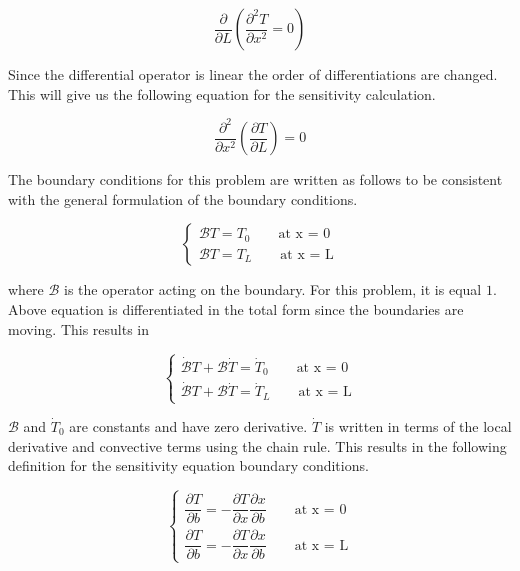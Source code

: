 \begin{equation*}
	\frac{\partial}{\partial L}
	\left( \frac{\partial^2 T}{\partial x^2} = 0 \right)
\end{equation*}

Since the differential operator is linear the order of differentiations are changed. This will give us the following equation for the sensitivity calculation.

\begin{equation}\label{eq:C2_laplaceSAequation}
	\frac{\partial^2}{\partial x^2} \left( \frac{\partial T}{\partial L} \right) = 0
\end{equation}

The boundary conditions for this problem are written as follows to be consistent with the general formulation of the boundary conditions. 

\begin{equation*}
\begin{cases}
	\mathcal{B}T = T_0 \qquad \text{at x = 0} \\
	\mathcal{B}T = T_L \qquad \text{at x = L}
\end{cases}
\end{equation*}

where $\mathcal{B}$ is the operator acting on the boundary. For this problem, it is equal $1$. Above equation is differentiated in the total form since the boundaries are moving. This results in

\begin{equation*}
\begin{cases}
	\dot{\mathcal{B}} T + \mathcal{B} \dot{T} = \dot{T}_0 \qquad \text{at x = 0} \\
	\dot{\mathcal{B}} T + \mathcal{B} \dot{T} = \dot{T}_L \qquad \text{at x = L}
\end{cases}
\end{equation*}

$\mathcal{B}$ and $\dot{T}_0$ are constants and have zero derivative. $\dot{T}$ is written in terms of the local derivative and convective terms using the chain rule. This results in the following definition for the sensitivity equation boundary conditions.

\begin{equation*}
\begin{cases}
	\dfrac{\partial T}{\partial b} = -\dfrac{\partial T}{\partial x} \dfrac{\partial x}{\partial b} \qquad \text{at x = 0}
	\\
	\dfrac{\partial T}{\partial b} = -\dfrac{\partial T}{\partial x} \dfrac{\partial x}{\partial b} \qquad \text{at x = L}
\end{cases}
\end{equation*}

